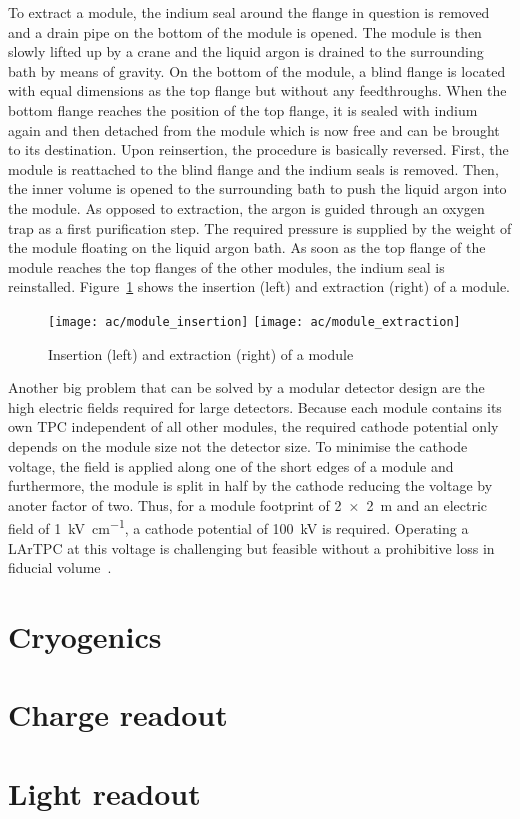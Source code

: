 To extract a module, the indium seal around the flange in question is removed and a drain pipe on the bottom of the module is opened.
The module is then slowly lifted up by a crane and the liquid argon is drained to the surrounding bath by means of gravity.
On the bottom of the module, a blind flange is located with equal dimensions as the top flange but without any feedthroughs.
When the bottom flange reaches the position of the top flange, it is sealed with indium again and then detached from the module which is now free and can be brought to its destination.
Upon reinsertion, the procedure is basically reversed.
First, the module is reattached to the blind flange and the indium seals is removed.
Then, the inner volume is opened to the surrounding bath to push the liquid argon into the module.
As opposed to extraction, the argon is guided through an oxygen trap as a first purification step.
The required pressure is supplied by the weight of the module floating on the liquid argon bath.
As soon as the top flange of the module reaches the top flanges of the other modules, the indium seal is reinstalled.
Figure~\ref{fig:ac_module-ins-ext} shows the insertion (left) and extraction (right) of a module.

\begin{figure}[htb] %
	\centering
	\texttt{[image: ac/module\_insertion]}
	\texttt{[image: ac/module\_extraction]}
	\caption{Insertion (left) and extraction (right) of a module}
	\label{fig:ac_module-ins-ext}
\end{figure}

Another big problem that can be solved by a modular detector design are the high electric fields required for large detectors.
Because each module contains its own TPC independent of all other modules, the required cathode potential only depends on the module size not the detector size.
To minimise the cathode voltage, the field is applied along one of the short edges of a module and furthermore, the module is split in half by the cathode reducing the voltage by anoter factor of two.
Thus, for a module footprint of \SI{2 x 2}{\metre} and an electric field of \SI{1}{\kilo\volt\per\centi\metre}, a cathode potential of \SI{100}{\kilo\volt} is required.
Operating a LArTPC at this voltage is challenging but feasible without a prohibitive loss in fiducial volume~\cite{AT}.


\section{Cryogenics\label{sec:ac_cryo}}


\section{Charge readout\label{ac_charge-readout}}


\section{Light readout\label{ac_light-readout}}